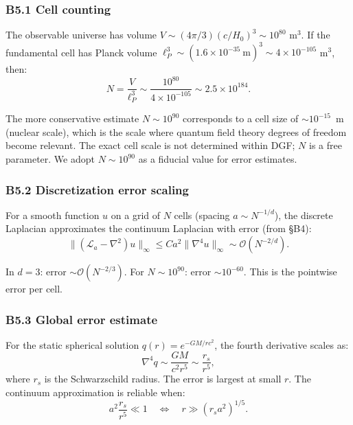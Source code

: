 \documentclass[reprint]{revtex4-2}
\begin{document}
\subsubsection{B5.1 Cell counting}

The observable universe has volume $V \sim (4\pi/3)(c/H_0)^3 \sim 10^{80}$ m$^3$. If the fundamental cell has Planck volume $\ell_P^3 \sim (1.6\times 10^{-35}~\text{m})^3 \sim 4\times 10^{-105}$ m$^3$, then:
\begin{equation}
N = \frac{V}{\ell_P^3} \sim \frac{10^{80}}{4\times 10^{-105}} \sim 2.5\times 10^{184}.
\label{eq:N_estimate}
\end{equation}

The more conservative estimate $N\sim 10^{90}$ corresponds to a cell size of $\sim 10^{-15}$~m (nuclear scale), which is the scale where quantum field theory degrees of freedom become relevant. The exact cell scale is not determined within DGF; $N$ is a free parameter. We adopt $N\sim 10^{90}$ as a fiducial value for error estimates.

\subsubsection{B5.2 Discretization error scaling}

For a smooth function $u$ on a grid of $N$ cells (spacing $a \sim N^{-1/d}$), the discrete Laplacian approximates the continuum Laplacian with error (from \S B4):
\begin{equation}
\|(\mathcal{L}_a - \nabla^2)u\|_\infty \le C a^2 \|\nabla^4 u\|_\infty \sim \mathcal{O}(N^{-2/d}).
\end{equation}

In $d=3$: error $\sim \mathcal{O}(N^{-2/3})$. For $N\sim 10^{90}$: error $\sim 10^{-60}$. This is the pointwise error per cell.

\subsubsection{B5.3 Global error estimate}

For the static spherical solution $q(r) = e^{-GM/rc^2}$, the fourth derivative scales as:
\begin{equation}
\nabla^4 q \sim \frac{GM}{c^2 r^5} \sim \frac{r_s}{r^5},
\end{equation}
where $r_s$ is the Schwarzschild radius. The error is largest at small $r$. The continuum approximation is reliable when:
\begin{equation}
a^2 \frac{r_s}{r^5} \ll 1 \quad\Longleftrightarrow\quad r \gg (r_s a^2)^{1/5}.
\end{equation}
\end{document}
